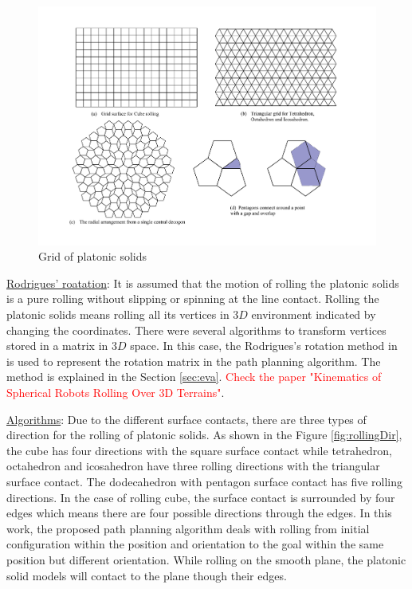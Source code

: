 %
\begin{figure}[h]
\centering
	\includegraphics[width=1\textwidth]{image/gridPlatonic.pdf}
	\caption{Grid of platonic solids}
	\label{fig:gridPlatonic}
\end{figure}


\noindent\uline{Rodrigues' roatation}: It is assumed that the motion of rolling the platonic solids is a pure rolling without slipping or spinning at the line contact.
Rolling the platonic solids means rolling all its vertices in $3D$ environment indicated by changing the coordinates. There were several algorithms to transform vertices stored in a matrix in $3D$ space. In this case, the Rodrigues's rotation method in \cite{Dai_Rodrigues_2015} is used to represent the rotation matrix in the path planning algorithm. The method is explained in the Section \ref{sec:eva}. 
\textcolor{red}{Check the paper "Kinematics of Spherical Robots Rolling Over 3D Terrains"}.

%
\clearpage
\newpage
\noindent\uline{Algorithms}:
Due to the different surface contacts, there are three types of direction for the rolling of platonic solids. As shown in the Figure \ref{fig:rollingDir}, the cube has four directions with the square surface contact while tetrahedron, octahedron and icosahedron have three rolling directions with the triangular surface contact. The dodecahedron with pentagon surface contact has five rolling directions. In the case of rolling cube, the surface contact is surrounded by four edges which means there are four possible directions through the edges. In this work, the proposed path planning algorithm deals with rolling from initial configuration within the position and orientation to the goal within the same position but different orientation. While rolling on the smooth plane, the platonic solid models will contact to the plane though their edges.\\


